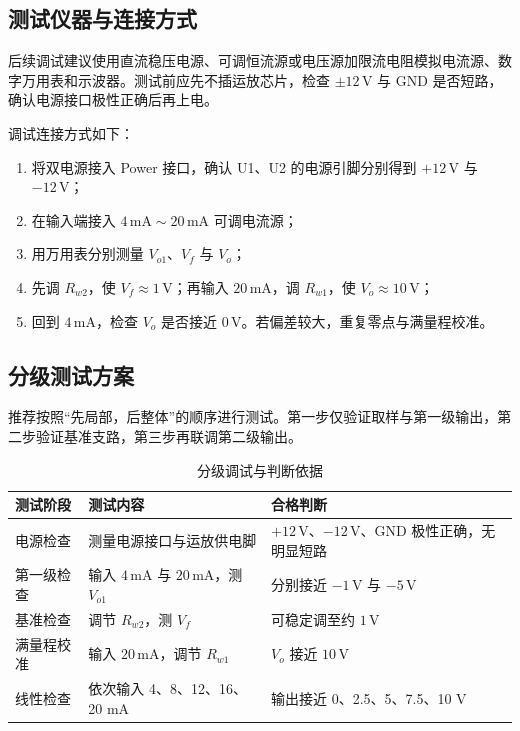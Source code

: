 \documentclass[UTF8,a4paper,zihao=-4]{ctexart}
\begin{document}
\subsection{测试仪器与连接方式}

后续调试建议使用直流稳压电源、可调恒流源或电压源加限流电阻模拟电流源、数字万用表和示波器。测试前应先不插运放芯片，检查 $\pm12\,\mathrm{V}$ 与 GND 是否短路，确认电源接口极性正确后再上电。

调试连接方式如下：
\begin{enumerate}
  \item 将双电源接入 Power 接口，确认 U1、U2 的电源引脚分别得到 $+12\,\mathrm{V}$ 与 $-12\,\mathrm{V}$；
  \item 在输入端接入 $4\,\mathrm{mA}\sim20\,\mathrm{mA}$ 可调电流源；
  \item 用万用表分别测量 $V_{o1}$、$V_f$ 与 $V_o$；
  \item 先调 $R_{w2}$，使 $V_f\approx1\,\mathrm{V}$；再输入 $20\,\mathrm{mA}$，调 $R_{w1}$，使 $V_o\approx10\,\mathrm{V}$；
  \item 回到 $4\,\mathrm{mA}$，检查 $V_o$ 是否接近 $0\,\mathrm{V}$。若偏差较大，重复零点与满量程校准。
\end{enumerate}

\subsection{分级测试方案}

推荐按照“先局部，后整体”的顺序进行测试。第一步仅验证取样与第一级输出，第二步验证基准支路，第三步再联调第二级输出。

\begin{table}[H]
  \centering
  \caption{分级调试与判断依据}
  \label{tab:test-plan}
  \begin{tabular}{>{\centering\arraybackslash}p{2.5cm} p{5.8cm} p{5.5cm}}
    \toprule
    测试阶段 & 测试内容 & 合格判断 \\
    \midrule
    电源检查 & 测量电源接口与运放供电脚 & $+12\,\mathrm{V}$、$-12\,\mathrm{V}$、GND 极性正确，无明显短路 \\
    第一级检查 & 输入 $4\,\mathrm{mA}$ 与 $20\,\mathrm{mA}$，测 $V_{o1}$ & 分别接近 $-1\,\mathrm{V}$ 与 $-5\,\mathrm{V}$ \\
    基准检查 & 调节 $R_{w2}$，测 $V_f$ & 可稳定调至约 $1\,\mathrm{V}$ \\
    满量程校准 & 输入 $20\,\mathrm{mA}$，调节 $R_{w1}$ & $V_o$ 接近 $10\,\mathrm{V}$ \\
    线性检查 & 依次输入 4、8、12、16、20 mA & 输出接近 0、2.5、5、7.5、10 V \\
    \bottomrule
  \end{tabular}
\end{table}
\end{document}

